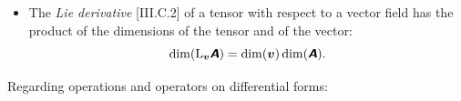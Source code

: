 \documentclass[\ifafour a4paper,12pt,\else a5paper,10pt,\fi%
onecolumn,oneside,article,%
british%
]{memoir}
\theoremstyle{remark}
\theoremstyle{innote}
\newcommand*{\mathte}[1]{\textbf{\textit{\textsf{#1}}}}
\renewcommand*{\|}[1][]{\nonscript\,#1\vert\nonscript\;\mathopen{}}
\newcommand*{\Li}{\mathrm{L}}
\newcommand*{\yA}{\mathte{A}}
\newcommand*{\yB}{\mathte{B}}
\newcommand*{\yv}{\bm{v}}
\begin{document}
\begin{itemize}[wide=0pt]
\smallskip



\item The \emph{Lie derivative} [III.C.2] of a tensor with respect to a
  vector field has the product of the dimensions of the tensor and of the
  vector:
  \begin{equation}
    \dim(\Li_{\yv}\yA) =\dim(\yv)\dim(\yA).
    \label{eq:lie_der}
\end{equation}
\end{itemize}

\medskip

Regarding operations and operators on differential forms:
\end{document}
